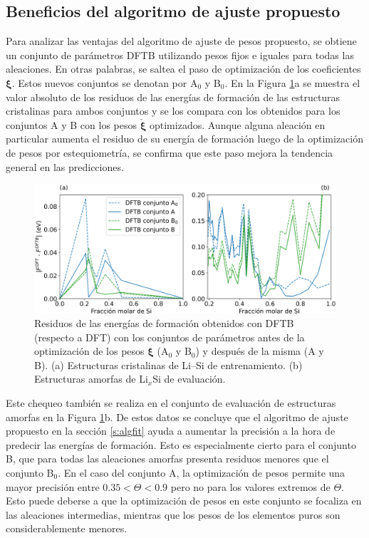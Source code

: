 \subsection{Beneficios del algoritmo de ajuste propuesto}

Para analizar las ventajas del algoritmo de ajuste de pesos propuesto, se
obtiene un conjunto de parámetros DFTB utilizando pesos fijos e iguales para
todas las aleaciones. En otras palabras, se saltea el paso de optimización de los
coeficientes $\boldsymbol{\xi}$. Estos nuevos conjuntos se denotan por A$_0$ y
B$_0$. En la Figura \ref{fig:residuos}a se muestra el valor absoluto de los
residuos de las energías de formación de las estructuras cristalinas para ambos
conjuntos y se los compara con los obtenidos para los conjuntos A y B con
los pesos $\check{\boldsymbol{\xi}}$ optimizados. Aunque alguna aleación en
particular aumenta el residuo de su energía de formación luego de la
optimización de pesos por estequiometría, se confirma que este paso mejora
la tendencia general en las predicciones.

\begin{figure}[h]
	\centering
	\includegraphics[width=\textwidth]{Silicio/modelo/resultados/residuos/residuos.png}
	\caption{Residuos de las energías de formación obtenidos con DFTB (respecto a
	DFT) con los conjuntos de parámetros antes de la optimización de los pesos
    $\boldsymbol{\xi}$ (A$_0$ y B$_0$) y después de la misma (A y B). (a) Estructuras 
    cristalinas de Li--Si de entrenamiento. (b) Estructuras amorfas de Li$_x$Si de
    evaluación.}
	\label{fig:residuos}
\end{figure}

Este chequeo también se realiza en el conjunto de evaluación de estructuras
amorfas en la Figura \ref{fig:residuos}b. De estos datos se concluye que el
algoritmo de ajuste propuesto en la sección \ref{s:algfit} ayuda a aumentar
la precisión a la hora de predecir las energías de formación. Esto es
especialmente cierto para el conjunto B, que para todas las aleaciones amorfas
presenta residuos menores que el conjunto B$_0$. En el caso del conjunto A, 
la optimización de pesos permite una mayor precisión entre $0.35 < \Theta < 0.9$ 
pero no para los valores extremos de $\Theta$. Esto puede deberse a que la 
optimización de pesos en este conjunto se focaliza en las aleaciones intermedias, 
mientras que los pesos de los elementos puros son considerablemente menores.
